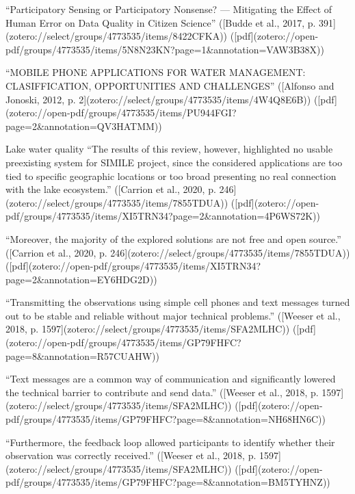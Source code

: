 “Participatory Sensing or Participatory Nonsense? — Mitigating the Effect of Human Error on Data Quality in Citizen Science” ([Budde et al., 2017, p. 391](zotero://select/groups/4773535/items/8422CFKA)) ([pdf](zotero://open-pdf/groups/4773535/items/5N8N23KN?page=1&annotation=VAW3B38X))

“MOBILE PHONE APPLICATIONS FOR WATER MANAGEMENT: CLASIFFICATION, OPPORTUNITIES AND CHALLENGES” ([Alfonso and Jonoski, 2012, p. 2](zotero://select/groups/4773535/items/4W4Q8E6B)) ([pdf](zotero://open-pdf/groups/4773535/items/PU944FGI?page=2&annotation=QV3HATMM))

Lake water quality 
“The results of this review, however, highlighted no usable preexisting system for SIMILE project, since the considered applications are too tied to specific geographic locations or too broad presenting no real connection with the lake ecosystem.” ([Carrion et al., 2020, p. 246](zotero://select/groups/4773535/items/7855TDUA)) ([pdf](zotero://open-pdf/groups/4773535/items/XI5TRN34?page=2&annotation=4P6WS72K))

“Moreover, the majority of the explored solutions are not free and open source.” ([Carrion et al., 2020, p. 246](zotero://select/groups/4773535/items/7855TDUA)) ([pdf](zotero://open-pdf/groups/4773535/items/XI5TRN34?page=2&annotation=EY6HDG2D))

“Transmitting the observations using simple cell phones and text messages turned out to be stable and reliable without major technical problems.” ([Weeser et al., 2018, p. 1597](zotero://select/groups/4773535/items/SFA2MLHC)) ([pdf](zotero://open-pdf/groups/4773535/items/GP79FHFC?page=8&annotation=R57CUAHW))

“Text messages are a common way of communication and significantly lowered the technical barrier to contribute and send data.” ([Weeser et al., 2018, p. 1597](zotero://select/groups/4773535/items/SFA2MLHC)) ([pdf](zotero://open-pdf/groups/4773535/items/GP79FHFC?page=8&annotation=NH68HN6C))

“Furthermore, the feedback loop allowed participants to identify whether their observation was correctly received.” ([Weeser et al., 2018, p. 1597](zotero://select/groups/4773535/items/SFA2MLHC)) ([pdf](zotero://open-pdf/groups/4773535/items/GP79FHFC?page=8&annotation=BM5TYHNZ))

